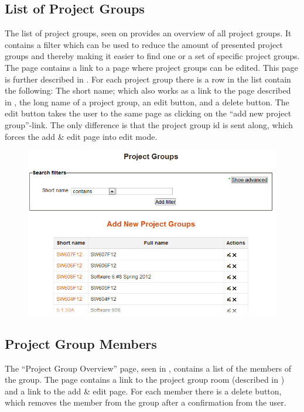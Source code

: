 \subsection{List of Project Groups}
\label{sec:preListPg}
The list of project groups, seen on  provides an overview of all project groups. 
It contains a filter which can be used to reduce the amount of presented project groups and thereby making it easier to find one or a set of specific project groups. 
The page contains a link to a page where project groups can be edited. 
This page is further described in .
For each project group there is a row in the list contain the following: The short name; which also works as a link to the page described in , the long name of a project group, an edit button, and a delete button. 
The edit button takes the user to the same page as clicking on the ``add new project group''-link. 
The only difference is that the project group id is sent along, which forces the add \& edit page into edit mode. 

\begin{figure}
	\centering
		\includegraphics[width=\textwidth]{images/moodleadminprojectgrouplist.png}

		\label{fig:moodleadouplist}
\end{figure}


\FloatBarrier

\subsection{Project Group Members}
\label{sec:projectGrpMem}
The ``Project Group Overview'' page, seen in , contains a list of the members of the group. 
The page contains a link to the project group room (described in ) and a link to the add \& edit page. 
For each member there is a delete button, which removes the member from the group after a confirmation from the user.

